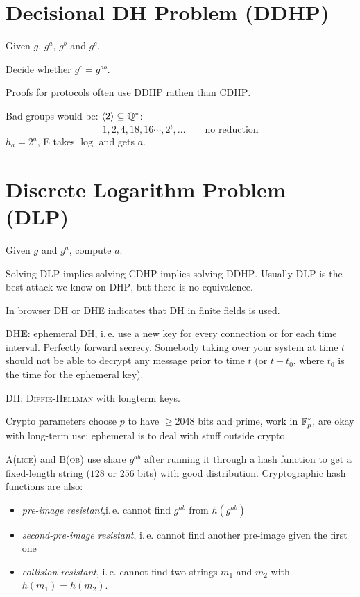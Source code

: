 \section{Decisional DH Problem (DDHP)}

Given $g$, $g^a$, $g^b$ and $g^c$.

Decide whether $g^c = g^{ab}$.

Proofs for protocols often use \textsc{DDHP} rathen than \textsc{CDHP}.

Bad groups would be: $\langle 2 \rangle \subseteq \mathbb{Q}^{\ast}$:
\[
1,2,4,18,16 \cdots, 2^i, \dots  \qquad \text{no reduction}
\]
$h_a=2^a$, \textsc{E} takes $\log$ and gets $a$.

\section{Discrete Logarithm Problem (DLP)}

Given $g$ and $g^a$, compute $a$.

Solving \textsc{DLP} implies solving \textsc{CDHP} implies solving \textsc{DDHP}. Usually \textsc{DLP} is the best attack we know on \textsc{DHP}, but there is no equivalence.

In browser \textsc{DH} or \textsc{DHE} indicates that \textsc{DH} in finite fields is used. 

\textsc{DH\textbf{E}}: ephemeral \textsc{DH}, i.\,e. use a new key for every connection or for each time interval.
Perfectly forward secrecy. Somebody taking over your system at time $t$ should not be able to decrypt any message prior to time $t$ (or $t-t_0$, where $t_0$ is the time for the ephemeral key).

\textsc{DH}: \textsc{Diffie-Hellman} with longterm keys.

Crypto parameters choose $p$ to have $\geq 2048$ bits and prime, work in $\mathbb{F}_p^{\ast}$, are okay with long-term use; ephemeral is to deal with stuff outside crypto.

\textsc{A(lice)} and \textsc{B(ob)} use share $g^{ab}$ after running it through a hash function to get a fixed-length string ($128$ or $256$ bits) with good distribution. Cryptographic hash functions are also:

\begin{itemize}
\item \emph{pre-image resistant},i.\,e. cannot find $g^{ab}$ from $h(g^{ab})$
\item \emph{second-pre-image resistant}, i.\,e. cannot find another pre-image given the first one
\item \emph{collision resistant}, i.\,e. cannot find two strings $m_1$ and $m_2$ with $h(m_1) = h(m_2)$.
\end{itemize}

